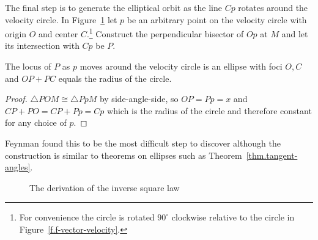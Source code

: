 
The final step is to generate the elliptical orbit as the line $Cp$ rotates around the velocity circle. In Figure~\ref{f.f-elliptical-orbit} let $p$ be an arbitrary point on the velocity circle with origin $O$ and center $C$.\footnote{For convenience the circle is rotated $90^\circ$ clockwise relative to the circle in Figure~\ref{f.f-vector-velocity}.} Construct the perpendicular bisector of $Op$ at $M$ and let its intersection with $Cp$ be $P$.
\begin{theorem}
The locus of $P$ as $p$ moves around the velocity circle is an ellipse with foci $O,C$ and $OP+PC$ equals the radius of the circle.
\end{theorem}
\begin{proof}
$\triangle POM\cong \triangle PpM$ by side-angle-side, so $OP=Pp=x$ and $CP+PO=CP+Pp=Cp$ which is the radius of the circle and therefore constant for any choice of $p$.\fqed
\end{proof} 

Feynman found this to be the most difficult step to discover \cite[p.~130]{lost} although the construction is similar to theorems on ellipses such as Theorem~\ref{thm.tangent-angles}.

\begin{figure}
\begin{center}
\caption{The derivation of the inverse square law}\label{f.f-elliptical-orbit}
\end{center}
\end{figure}
